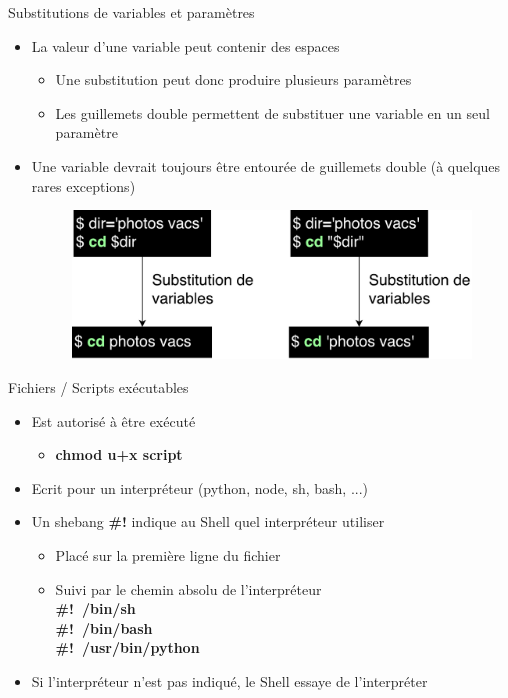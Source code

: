 \documentclass[xcolor=table]{beamer}
\begin{document}
\begin{frame}{Substitutions de variables et paramètres}
\begin{itemize}
    \item La valeur d'une variable peut contenir des espaces
    \begin{itemize}
        \item Une substitution peut donc produire plusieurs paramètres
        \item Les guillemets double permettent de substituer une variable en un seul paramètre
    \end{itemize}
    \item Une variable devrait toujours être entourée de guillemets double (à quelques rares exceptions)
    \begin{figure}
        \includegraphics[scale=0.5]{fig/double-quoted-var.pdf}
    \end{figure}
\end{itemize}
\end{frame}

\begin{frame}{Fichiers / Scripts exécutables}
\begin{itemize}
    \item Est autorisé à être exécuté
    \begin{itemize}
        \item \textbf{chmod u+x script}
    \end{itemize}
    \item Ecrit pour un interpréteur (python, node, sh, bash, ...)
    \item Un shebang \textbf{\#!} indique au Shell quel interpréteur utiliser
    \begin{itemize}
        \item Placé sur la première ligne du fichier
        \item Suivi par le chemin absolu de l'interpréteur\\
        \textbf{\#!~/bin/sh}\\
        \textbf{\#!~/bin/bash}\\
        \textbf{\#!~/usr/bin/python}
    \end{itemize}
    \item Si l'interpréteur n'est pas indiqué, le Shell essaye de l'interpréter
\end{itemize}
\end{frame}
\end{document}
